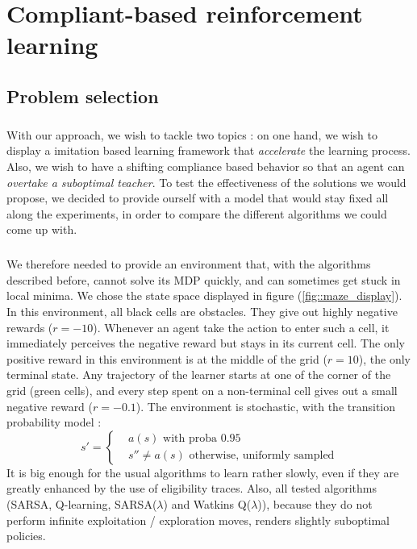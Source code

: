\documentclass[a4paper]{report}
\begin{document}
	\chapter{Compliant-based reinforcement learning}
	{
		\section{Problem selection}
		{
			\paragraph{} With our approach, we wish to tackle two topics : on one hand, we wish to display a imitation based learning framework that \emph{accelerate} the learning process. Also, we wish to have a shifting compliance based behavior so that an agent can \emph{overtake a suboptimal teacher}. To test the effectiveness of the solutions we would propose, we decided to provide ourself with a model that would stay fixed all along the experiments, in order to compare the different algorithms we could come up with. 
			
			\paragraph{} We therefore needed to provide an environment that, with the algorithms described before, cannot solve its MDP quickly, and can sometimes get stuck in local minima. We chose the state space displayed in figure (\ref{fig::maze_display}). In this environment, all black cells are obstacles. They give out highly negative rewards ($r=-10$). Whenever an agent take the action to enter such a cell, it immediately perceives the negative reward but stays in its current cell. The only positive reward in this environment is at the middle of the grid ($r=10$), the only terminal state. Any trajectory of the learner starts at one of the corner of the grid (green cells), and every step spent on a non-terminal cell gives out a small negative reward ($r=-0.1$). The environment is stochastic, with the transition probability model : 
			\begin{equation}
				s' = \left\{ 
					\begin{aligned}
						&a(s) \text{ with proba } 0.95 \\
						&s'' \neq a(s) \text{ otherwise, uniformly sampled}
					\end{aligned}\right.
			\end{equation}
			 It is big enough for the usual algorithms to learn rather slowly, even if they are greatly enhanced by the use of eligibility traces. Also, all tested algorithms (SARSA, Q-learning, SARSA($\lambda$) and Watkins Q($\lambda$)), because they do not perform infinite exploitation / exploration moves, renders slightly suboptimal policies.
			
}}
\end{document}
